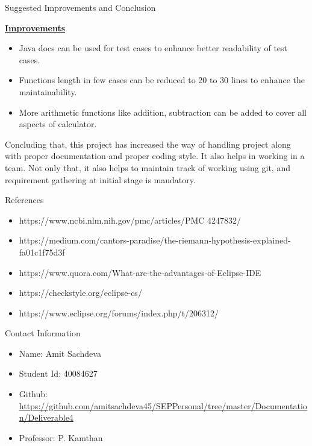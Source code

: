 \documentclass[final]{beamer}
\newlength{\onecolwid}
\begin{document}
\begin{frame}
\begin{columns}[t]
\begin{column}{\onecolwid}
\begin{exampleblock}{Suggested Improvements and Conclusion}
\small{
\textbf{\underline{Improvements}}
\begin{itemize}
\item Java docs can be used for test cases to enhance better readability of test cases.
\item Functions length in few cases can be reduced to 20 to 30 lines to enhance the maintainability.
\item More arithmetic functions like addition, subtraction can be added to cover all aspects of calculator.
\end{itemize}
Concluding that, this project has increased the way of handling project along with proper documentation and proper coding style. It also helps in working in a team. Not only that, it also helps to maintain track of working using git, and requirement gathering at initial stage is mandatory.}
\end{exampleblock}



\begin{exampleblock}{References}

\small{\begin{itemize}
\item  https://www.ncbi.nlm.nih.gov/pmc/articles/PMC 4247832/
\item https://medium.com/cantors-paradise/the-riemann-hypothesis-explained-fa01c1f75d3f
\item https://www.quora.com/What-are-the-advantages-of-Eclipse-IDE
\item https://checkstyle.org/eclipse-cs/
\item https://www.eclipse.org/forums/index.php/t/206312/
\end{itemize}}
\end{exampleblock}



\begin{block}{Contact Information}

\small{\begin{itemize}
\item Name: Amit Sachdeva
\item Student Id: 40084627
\item Github: \url{https://github.com/amitsachdeva45/SEPPersonal/tree/master/Documentation/Deliverable4}
\item Professor: P. Kamthan
\end{itemize}}


\end{block}
\end{column}
\end{columns}
\end{frame}
\end{document}
